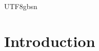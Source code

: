 \documentclass{llmxive}
\begin{document}
\begin{CJK*}{UTF8}{gbsn}



\vspace{-1.8em}
\section{Introduction}
\label{sec:intro}


\end{CJK*}
\end{document}
